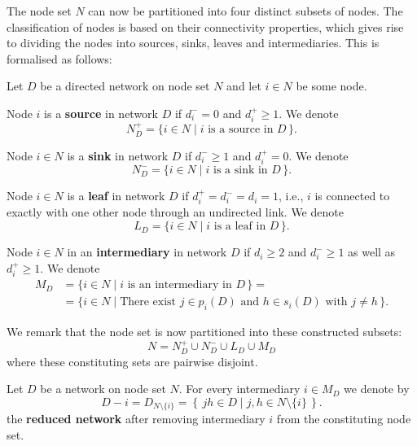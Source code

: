The node set $N$ can now be partitioned into four distinct subsets of nodes. The classification of nodes is based on their connectivity properties, which gives rise to dividing the nodes into sources, sinks, leaves and intermediaries. This is formalised as follows:
\begin{definition}
	Let $D$ be a directed network on node set $N$ and let $i \in N$ be some node.
	\begin{numm}
		\item Node $i$ is a \textbf{source} in network $D$ if $d_{i}^{-} = 0$ and $d_{i}^{+} \geqslant 1$. We denote
		\[
		N^+_D = \{ i \in N \mid i \mbox{ is a source in } D \, \} .
		\]
	\item Node $i \in N$ is a \textbf{sink} in network $D$ if $d_{i}^{-} \geqslant 1$ and $d_{i}^{+} = 0$. We denote
	\[
		N^-_D = \{ i \in N \mid i \mbox{ is a sink in } D \, \} .
	\]
	\item Node $i \in N$ is a \textbf{leaf} in network $D$ if $d_i^+ = d_i^- = d_i =1$, i.e., $i$ is connected to exactly with one other node through an undirected link. We denote
	\[
	L_D =  \{ i \in N \mid i \mbox{ is a leaf in } D \, \} .
	\]
	\item Node $i \in N$ in an \textbf{intermediary} in network $D$ if $d_i \geqslant 2$ and $d_{i}^{-} \geqslant 1$ as well as $d_{i}^{+} \geqslant 1$. We denote
	\begin{align*}
		M_D & = \{ i \in N \mid i \mbox{ is an intermediary in } D \, \} = \\
		& = \{ i \in N \mid \mbox{There exist } j \in p_i (D) \mbox{ and } h \in s_i (D) \mbox{ with } j \neq h \, \} .
	\end{align*}
	\end{numm}
\end{definition}

\noindent
We remark that the node set is now partitioned into these constructed subsets:
\begin{equation}
	N = N^+_D \cup N^-_D \cup L_D \cup M_D
\end{equation}
where these constituting sets are pairwise disjoint.

\begin{definition}
	Let $D$ be a network on node set $N$. For every intermediary $i \in M_D$ we denote by
	\begin{equation}
		D - i = D_{N \setminus \{ i \} } = \left\{ \, jh \in D \mid j,h \in N \setminus \{ i \} \, \right\} .
	\end{equation}
	the \textbf{reduced network} after removing intermediary $i$ from the constituting node set.
\end{definition}

